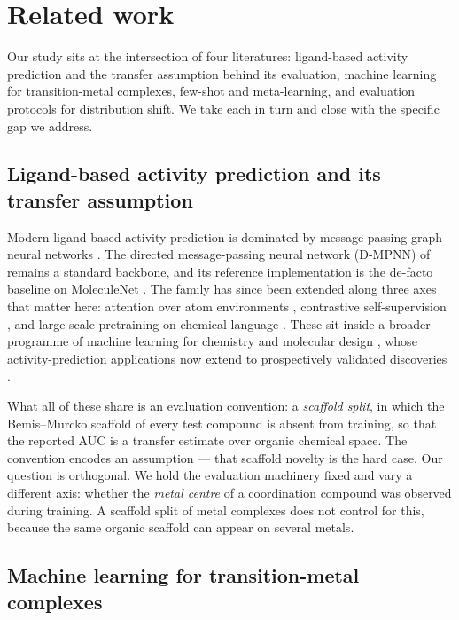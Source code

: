 \section{Related work}
\label{sec:related}

Our study sits at the intersection of four literatures: ligand-based activity
prediction and the transfer assumption behind its evaluation, machine learning
for transition-metal complexes, few-shot and meta-learning, and evaluation
protocols for distribution shift. We take each in turn and close with the
specific gap we address.

\subsection{Ligand-based activity prediction and its transfer assumption}

Modern ligand-based activity prediction is dominated by message-passing graph
neural networks \citep{gilmer2017mpnn,hamilton2017graph}. The directed
message-passing neural network (D-MPNN) of \citet{dmpnn2019} remains a standard
backbone, and its reference implementation \citep{chemprop} is the de-facto
baseline on MoleculeNet \citep{moleculenet2018}. The family has since been
extended along three axes that matter here: attention over atom environments
\citep{attentivefp}, contrastive self-supervision \citep{molclr}, and
large-scale pretraining on chemical language \citep{molformer}. These sit inside
a broader programme of machine learning for chemistry
\citep{butler2018,mater2019} and molecular design
\citep{sanchezlengeling2018,gomezbombarelli2018}, whose activity-prediction
applications now extend to prospectively validated discoveries
\citep{stokes2020}.

What all of these share is an evaluation convention: a \emph{scaffold split},
in which the Bemis--Murcko scaffold \citep{bemis1996murcko} of every test
compound is absent from training, so that the reported AUC is a transfer
estimate over organic chemical space. The convention encodes an assumption ---
that scaffold novelty is the hard case. Our question is orthogonal. We hold the
evaluation machinery fixed and vary a different axis: whether the \emph{metal
centre} of a coordination compound was observed during training. A scaffold
split of metal complexes does not control for this, because the same organic
scaffold can appear on several metals.

\subsection{Machine learning for transition-metal complexes}

